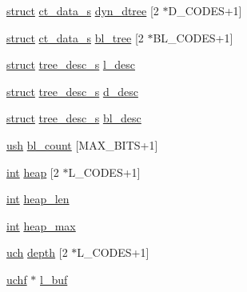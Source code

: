 \begin{DoxyCompactItemize}
\item 
\hyperlink{sdlgamepad_8dox_aba655c5729da86df745f0c8e7f9ba8d2}{struct} \hyperlink{structct__data__s}{ct\-\_\-data\-\_\-s} \hyperlink{structinternal__state_a42a52476d3cde41e57a6ef2a6a78008f}{dyn\-\_\-dtree} \mbox{[}2 $\ast$D\-\_\-\-C\-O\-D\-E\-S+1\mbox{]}
\item 
\hyperlink{sdlgamepad_8dox_aba655c5729da86df745f0c8e7f9ba8d2}{struct} \hyperlink{structct__data__s}{ct\-\_\-data\-\_\-s} \hyperlink{structinternal__state_a98131fc5b64d0d7542bc3621aef19854}{bl\-\_\-tree} \mbox{[}2 $\ast$B\-L\-\_\-\-C\-O\-D\-E\-S+1\mbox{]}
\item 
\hyperlink{sdlgamepad_8dox_aba655c5729da86df745f0c8e7f9ba8d2}{struct} \hyperlink{structtree__desc__s}{tree\-\_\-desc\-\_\-s} \hyperlink{structinternal__state_a0266c4e0250652904e6b4908d8da84a9}{l\-\_\-desc}
\item 
\hyperlink{sdlgamepad_8dox_aba655c5729da86df745f0c8e7f9ba8d2}{struct} \hyperlink{structtree__desc__s}{tree\-\_\-desc\-\_\-s} \hyperlink{structinternal__state_ab2fddb383d3055b6ec81c7fef14e99d8}{d\-\_\-desc}
\item 
\hyperlink{sdlgamepad_8dox_aba655c5729da86df745f0c8e7f9ba8d2}{struct} \hyperlink{structtree__desc__s}{tree\-\_\-desc\-\_\-s} \hyperlink{structinternal__state_aa0e5da102c35a7e7d22dd1894039393b}{bl\-\_\-desc}
\item 
\hyperlink{zutil_8h_a3754180d606d4ed15468d15d9665aa2e}{ush} \hyperlink{structinternal__state_abf9e786c8e5b4ab5d620ab123208034c}{bl\-\_\-count} \mbox{[}M\-A\-X\-\_\-\-B\-I\-T\-S+1\mbox{]}
\item 
\hyperlink{ioapi_8h_a787fa3cf048117ba7123753c1e74fcd6}{int} \hyperlink{structinternal__state_ad7edb9b1d387e631bc6fde1cad0af758}{heap} \mbox{[}2 $\ast$L\-\_\-\-C\-O\-D\-E\-S+1\mbox{]}
\item 
\hyperlink{ioapi_8h_a787fa3cf048117ba7123753c1e74fcd6}{int} \hyperlink{structinternal__state_a0659e23b0188ac16db58f98ae2b67b6b}{heap\-\_\-len}
\item 
\hyperlink{ioapi_8h_a787fa3cf048117ba7123753c1e74fcd6}{int} \hyperlink{structinternal__state_aa8c78bbfa5d71f3ccc55445a62897f47}{heap\-\_\-max}
\item 
\hyperlink{zutil_8h_af3307af5922c72924a837559c801a8a4}{uch} \hyperlink{structinternal__state_a8e525b4f3dfa38b3bbcb8b427e333570}{depth} \mbox{[}2 $\ast$L\-\_\-\-C\-O\-D\-E\-S+1\mbox{]}
\item 
\hyperlink{zutil_8h_aaa6fdf02a2fdaf3731f17a19920ddb0b}{uchf} $\ast$ \hyperlink{structinternal__state_a5e6c4269e29696b192e02fd01381e400}{l\-\_\-buf}

\end{DoxyCompactItemize}
